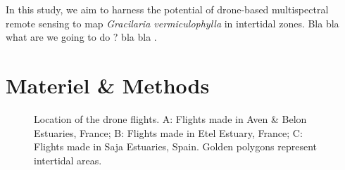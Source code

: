 \documentclass[
  letterpaper,
  DIV=11,
  numbers=noendperiod]{scrartcl}
\begin{document}
In this study, we aim to harness the potential of drone-based
multispectral remote sensing to map \emph{Gracilaria vermiculophylla} in
intertidal zones. Bla bla what are we going to do ? bla bla .

\section{Materiel \& Methods}\label{materiel-methods}

\label{cell-fig-location_sites}
\begin{figure}[H]


\caption{\label{fig-location_sites}Location of the drone flights. A:
Flights made in Aven \& Belon Estuaries, France; B: Flights made in Etel
Estuary, France; C: Flights made in Saja Estuaries, Spain. Golden
polygons represent intertidal areas.}

\end{figure}%
\end{document}
